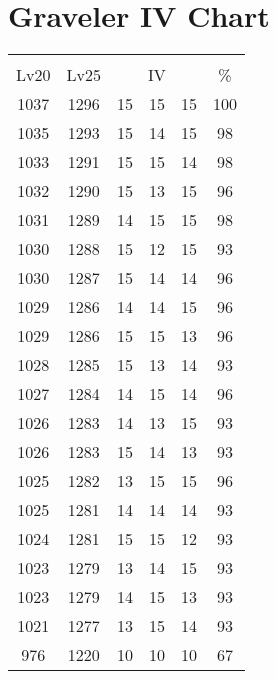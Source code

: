 \documentclass{article}%
\begin{document}
%
\normalsize%
\section{Graveler IV Chart}%
\label{sec:Graveler IV Chart}%
\renewcommand{\arraystretch}{1.5}%
\begin{tabular}{|c|c|c|c|c|c|}%
\hline%
\multicolumn{6}{|c|}{\textcolor{white}{ 
\linebreak{Graveler}
}%
\cellcolor{black}}\\%
\multicolumn{1}{|c}{Lv20}&\multicolumn{1}{c|}{Lv25}&\multicolumn{3}{c|}{IV}&\multicolumn{1}{|c|}{\%}\\%
\hline%
\rowcolor{color100}%
1037&1296&15&15&15&100\\%
\hline%
\rowcolor{color98}%
1035&1293&15&14&15&98\\%
\hline%
\rowcolor{color98}%
1033&1291&15&15&14&98\\%
\hline%
\rowcolor{color96}%
1032&1290&15&13&15&96\\%
\hline%
\rowcolor{color98}%
1031&1289&14&15&15&98\\%
\hline%
\rowcolor{color93}%
1030&1288&15&12&15&93\\%
\hline%
\rowcolor{color96}%
1030&1287&15&14&14&96\\%
\hline%
\rowcolor{color96}%
1029&1286&14&14&15&96\\%
\hline%
\rowcolor{color96}%
1029&1286&15&15&13&96\\%
\hline%
\rowcolor{color93}%
1028&1285&15&13&14&93\\%
\hline%
\rowcolor{color96}%
1027&1284&14&15&14&96\\%
\hline%
\rowcolor{color93}%
1026&1283&14&13&15&93\\%
\hline%
\rowcolor{color93}%
1026&1283&15&14&13&93\\%
\hline%
\rowcolor{color96}%
1025&1282&13&15&15&96\\%
\hline%
\rowcolor{color93}%
1025&1281&14&14&14&93\\%
\hline%
\rowcolor{color93}%
1024&1281&15&15&12&93\\%
\hline%
\rowcolor{color93}%
1023&1279&13&14&15&93\\%
\hline%
\rowcolor{color93}%
1023&1279&14&15&13&93\\%
\hline%
\rowcolor{color93}%
1021&1277&13&15&14&93\\%
\hline%
\rowcolor{color91}%
976&1220&10&10&10&67\\%
\end{tabular}

%
\end{document}
